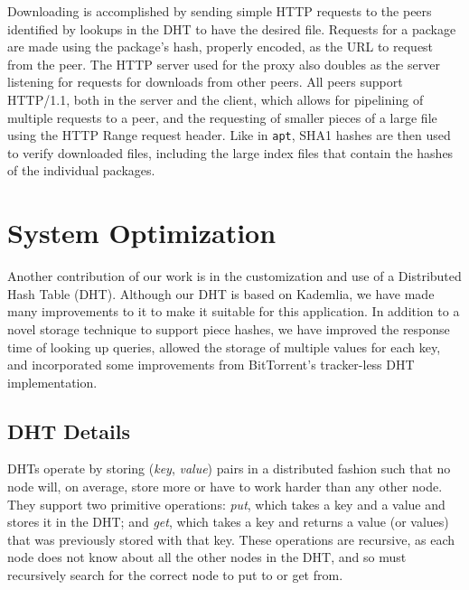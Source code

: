 \documentclass[conference]{IEEEtran}
\begin{document}
Downloading is accomplished by sending simple HTTP requests to the
peers identified by lookups in the DHT to have the desired file.
Requests for a package are made using the package's hash, properly
encoded, as the URL to request from the peer. The HTTP server used
for the proxy also doubles as the server listening for requests for
downloads from other peers. All peers support HTTP/1.1, both in the
server and the client, which allows for pipelining of multiple
requests to a peer, and the requesting of smaller pieces of a large
file using the HTTP Range request header. Like in \texttt{apt},
SHA1 hashes are then used to verify downloaded files, including the large
index files that contain the hashes of the individual packages.


\section{System Optimization}
\label{custom_dht}

Another contribution of our work is in the customization and use of
a Distributed Hash Table (DHT). Although our DHT is based on
Kademlia, we have made many improvements to it to make it suitable
for this application. In addition to a novel storage technique to
support piece hashes, we have improved the response time of looking
up queries, allowed the storage of multiple values for each key, and
incorporated some improvements from BitTorrent's tracker-less DHT
implementation.

\subsection{DHT Details}
\label{dht}

DHTs operate by storing (\emph{key}, \emph{value}) pairs in a
distributed fashion such that no node will, on average, store more or have to work harder
than any other node. They support two primitive operations:
\emph{put}, which takes a key and a value and stores it in the DHT;
and \emph{get}, which takes a key and returns a value (or values)
that was previously stored with that key. These operations are
recursive, as each node does not know about all the other nodes in the
DHT, and so must recursively search for the correct node to put to
or get from.
\end{document}
